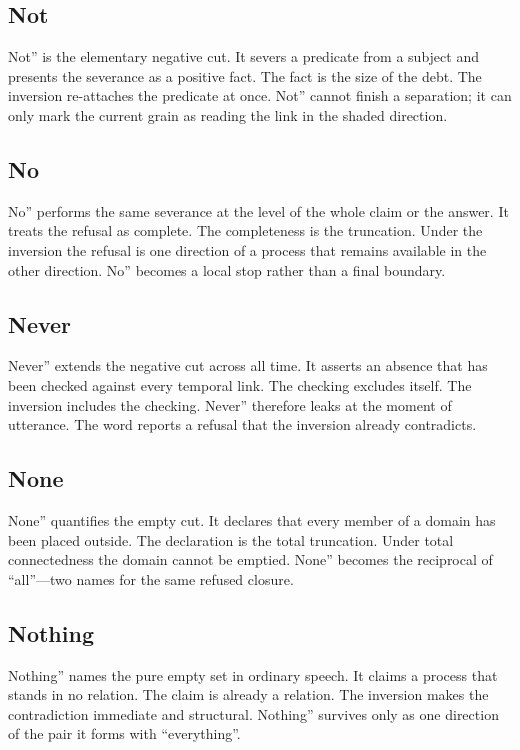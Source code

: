 \documentclass[11pt,a4paper]{article}
\begin{document}
\subsection{Not} Not'' is the elementary negative cut. It severs a predicate from a subject and presents the severance as a positive fact. The fact is the size of the debt. The inversion re-attaches the predicate at once. Not'' cannot finish a separation; it can only mark the current grain as reading the link in the shaded direction.

\subsection{No} No'' performs the same severance at the level of the whole claim or the answer. It treats the refusal as complete. The completeness is the truncation. Under the inversion the refusal is one direction of a process that remains available in the other direction. No'' becomes a local stop rather than a final boundary.

\subsection{Never} Never'' extends the negative cut across all time. It asserts an absence that has been checked against every temporal link. The checking excludes itself. The inversion includes the checking. Never'' therefore leaks at the moment of utterance. The word reports a refusal that the inversion already contradicts.

\subsection{None} None'' quantifies the empty cut. It declares that every member of a domain has been placed outside. The declaration is the total truncation. Under total connectedness the domain cannot be emptied. None'' becomes the reciprocal of ``all''—two names for the same refused closure.

\subsection{Nothing} Nothing'' names the pure empty set in ordinary speech. It claims a process that stands in no relation. The claim is already a relation. The inversion makes the contradiction immediate and structural. Nothing'' survives only as one direction of the pair it forms with ``everything''.
\end{document}
